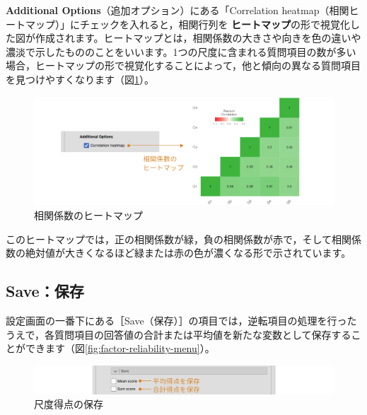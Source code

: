 \documentclass[
  12pt,
  a5jpaper,
  lualatex, ja=standard]{bxjsbook}
\renewcommand{\emph}[1]{\textbf{\color{emph} #1}}
\begin{document}
\textbf{Additional Options}（追加オプション）にある「Correlation heatmap（相関ヒートマップ）」にチェックを入れると，相関行列を\emph{ヒートマップ}の形で視覚化した図が作成されます。ヒートマップとは，相関係数の大きさや向きを色の違いや濃淡で示したもののことをいいます。1つの尺度に含まれる質問項目の数が多い場合，ヒートマップの形で視覚化することによって，他と傾向の異なる質問項目を見つけやすくなります（図\ref{fig:factor-reliability-heatmap}）。

\begin{figure}[!ht]

{\centering \includegraphics[width=1\linewidth]{images/factor/reliability-heatmap} 

}

\caption{相関係数のヒートマップ}\label{fig:factor-reliability-heatmap}
\end{figure}

このヒートマップでは，正の相関係数が緑，負の相関係数が赤で，そして相関係数の絶対値が大きくなるほど緑または赤の色が濃くなる形で示されています。

\hypertarget{sub:factor-reliability-save}{%
\subsection{Save：保存}\label{sub:factor-reliability-save}}

設定画面の一番下にある［Save（保存）］の項目では，逆転項目の処理を行ったうえで，各質問項目の回答値の合計または平均値を新たな変数として保存することができます（図\ref{fig:factor-reliability-menu}）。

\begin{figure}[!ht]

{\centering \includegraphics[width=1\linewidth]{images/factor/reliability-save-scores} 

}

\caption{尺度得点の保存}\label{fig:factor-reliability-save-scores}
\end{figure}
\end{document}
